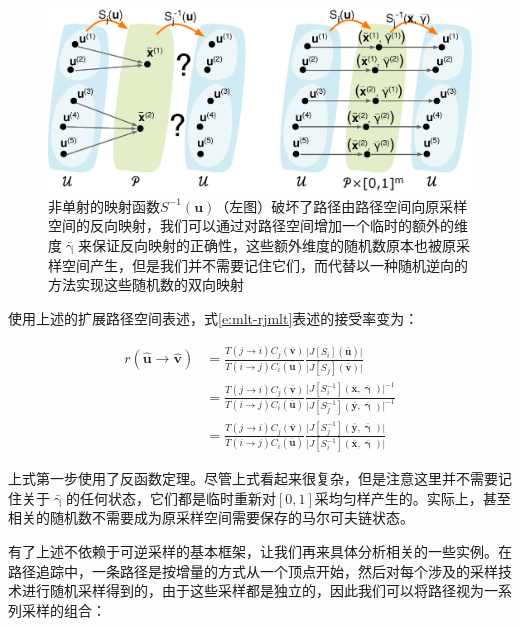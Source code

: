 \begin{figure}
	\includegraphics[width=1.\textwidth]{figures/mlt/non-injective}
	\caption{非单射的映射函数$S^{-1}(\mathbf{u})$（左图）破坏了路径由路径空间向原采样空间的反向映射，我们可以通过对路径空间增加一个临时的额外的维度$\bar{\upgamma}$来保证反向映射的正确性，这些额外维度的随机数原本也被原采样空间产生，但是我们并不需要记住它们，而代替以一种随机逆向的方法实现这些随机数的双向映射}
	\label{f:mlt-non-injective}
\end{figure}

使用上述的扩展路径空间表述，式\ref{e:mlt-rjmlt}表述的接受率变为：

\begin{equation}\label{e:mlt-rjmlt-general}
\begin{aligned}
	r(\hat{\mathbf{u}}\to\hat{\mathbf{v}})&=\frac{T(j\to i)C_j(\bar{\mathbf{v}})}{T(i\to j)C_i(\bar{\mathbf{u}})}\frac{\big|J[S_i](\bar{\mathbf{u}})\big|}{\big|J[S_j](\bar{\mathbf{v}})\big|}\\
	&=\frac{T(j\to i)C_j(\bar{\mathbf{v}})}{T(i\to j)C_i(\bar{\mathbf{u}})}\frac{\big|J[S^{-1}_i](\bar{\mathbf{x}},\bar{\mathbf{\upgamma}})\big|^{-1}}{\big|J[S^{-1}_j](\bar{\mathbf{y}},\bar{\mathbf{\upgamma}})\big|^{-1}}\\
	&=\frac{T(j\to i)C_j(\bar{\mathbf{v}})}{T(i\to j)C_i(\bar{\mathbf{u}})}\frac{\big|J[S^{-1}_j](\bar{\mathbf{y}},\bar{\mathbf{\upgamma}})\big|}{\big|J[S^{-1}_i](\bar{\mathbf{x}},\bar{\mathbf{\upgamma}})\big|}
\end{aligned}
\end{equation}

\noindent 上式第一步使用了反函数定理。尽管上式看起来很复杂，但是注意这里并不需要记住关于$\bar{\upgamma}$的任何状态，它们都是临时重新对$[0,1]$采均匀样产生的。实际上，甚至相关的随机数不需要成为原采样空间需要保存的马尔可夫链状态。

有了上述不依赖于可逆采样的基本框架，让我们再来具体分析相关的一些实例。在路径追踪中，一条路径是按增量的方式从一个顶点开始，然后对每个涉及的采样技术进行随机采样得到的，由于这些采样都是独立的，因此我们可以将路径视为一系列采样的组合：

